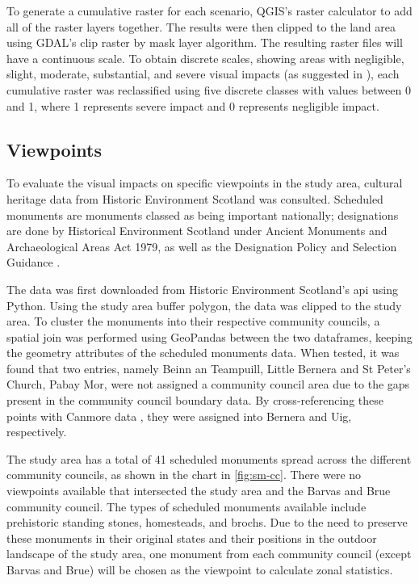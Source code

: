 To generate a cumulative raster for each scenario, QGIS's raster calculator to add all of the raster layers together. The results were then clipped to the land area using GDAL's clip raster by mask layer algorithm. The resulting raster files will have a continuous scale. To obtain discrete scales, showing areas with negligible, slight, moderate, substantial, and severe visual impacts (as suggested in \cite{falconer2013}), each cumulative raster was reclassified using five discrete classes with values between 0 and 1, where 1 represents severe impact and 0 represents negligible impact.

\subsection{Viewpoints}

To evaluate the visual impacts on specific viewpoints in the study area, cultural heritage data from Historic Environment Scotland was consulted. Scheduled monuments are monuments classed as being important nationally; designations are done by Historical Environment Scotland under Ancient Monuments and Archaeological Areas Act 1979, as well as the Designation Policy and Selection Guidance \autocite{hes-scheduling}.

The data was first downloaded from Historic Environment Scotland's \gls{api} using Python. Using the study area buffer polygon, the data was clipped to the study area. To cluster the monuments into their respective community councils, a spatial join was performed using GeoPandas between the two dataframes, keeping the geometry attributes of the scheduled monuments data. When tested, it was found that two entries, namely Beinn an Teampuill, Little Bernera and St Peter's Church, Pabay Mor, were not assigned a community council area due to the gaps present in the community council boundary data. By cross-referencing these points with Canmore data \autocite{canmore}, they were assigned into Bernera and Uig, respectively.

The study area has a total of 41 scheduled monuments spread across the different community councils, as shown in the chart in \autoref{fig:sm-cc}. There were no viewpoints available that intersected the study area and the Barvas and Brue community council. The types of scheduled monuments available include prehistoric standing stones, homesteads, and brochs. Due to the need to preserve these monuments in their original states and their positions in the outdoor landscape of the study area, one monument from each community council (except Barvas and Brue) will be chosen as the viewpoint to calculate zonal statistics.

